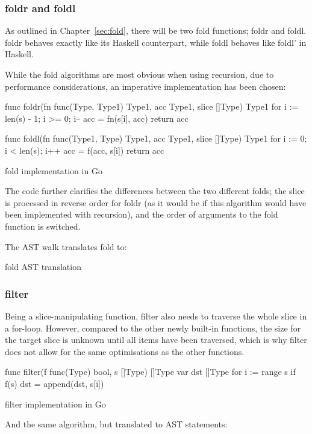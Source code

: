 \subsubsection{foldr and foldl}

As outlined in Chapter~\ref{sec:fold}, there will be two fold functions;
foldr and foldl. foldr behaves exactly like its Haskell counterpart,
while foldl behaves like foldl' in Haskell.

While the fold algorithms are most obvious when using recursion, due to
performance considerations, an imperative implementation has been chosen:

\begin{listing}
	\begin{gocode}
func foldr(fn func(Type, Type1) Type1, acc Type1, slice []Type) Type1 {
	for i := len(s) - 1; i >= 0; i-- {
		acc = fn(s[i], acc)
	}
	return acc
}

func foldl(fn func(Type1, Type) Type1, acc Type1, slice []Type) Type1 {
	for i := 0; i < len(s); i++ {
		acc = f(acc, s[i])
	}
	return acc
}
\end{gocode}
	\caption{fold implementation in Go}
\end{listing}
The code further clarifies the differences between the two different folds;
the slice is processed in reverse order for foldr (as it would be if this
algorithm would have been implemented with recursion), and the order of
arguments to the fold function is switched.

The AST walk translates fold to:
\begin{code}
	\caption{fold AST translation\autocite{fold-walk-implementation}}
\end{code}
\subsubsection{filter}\label{ch:impl-filter}

Being a slice-manipulating function, filter also needs to traverse the whole
slice in a for-loop. However, compared to the other newly built-in functions,
the size for the target slice is unknown until all items have been traversed,
which is why filter does not allow for the same optimisations as the other
functions.

\begin{listing}
	\begin{gocode}
func filter(f func(Type) bool, s []Type) []Type {
	var dst []Type
	for i := range s {
			if f(s) {
				dst = append(dst, s[i])
			}
	}
}
	\end{gocode}
	\caption{filter implementation in Go}
\end{listing}
And the same algorithm, but translated to AST statements:

